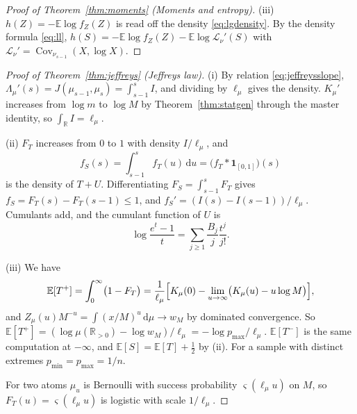 \documentclass[sn-mathphys-num]{sn-jnl}\newcommand{\SNJNL}{}
\theoremstyle{thmstyleone}
\theoremstyle{thmstyletwo}
\theoremstyle{thmstylethree}
\theoremstyle{thmstyleone}
\providecommand{\R}{\mathbb{R}}
\providecommand{\E}{\mathbb{E}}
\providecommand{\Cov}{\operatorname{Cov}}
\providecommand{\Rpos}{\mathbb{R}_{>0}}
\providecommand{\Leh}{\mathscr{L}}
\providecommand{\dd}{\,\mathrm{d}}
\begin{document}
\begin{appendices}
\begin{proof}[Proof of Theorem~\ref{thm:moments} (Moments and entropy)]
			\noindent(iii) $h(Z)=-\E\log f_Z(Z)$ is
			read off the density \eqref{eq:lgdensity}. By the density
			formula \eqref{eq:ll},
			$h(S)=-\E\log f_Z(Z)-\E\log\Leh_\nu'(S)$ with
			$\Leh_\nu'=\Cov_{\nu_{s-1}}(X,\log X)$.
		\end{proof}
		
		\begin{proof}[Proof of Theorem~\ref{thm:jeffreys} (Jeffreys law)]\leavevmode
			
			\noindent(i) By relation \eqref{eq:jeffreysslope},
			$\Lambda_\mu'(s)=J(\mu_{s-1},\mu_s)=\int_{s-1}^{s}I$, and dividing
			by $\ell_\mu$ gives the density. $K_\mu'$ increases from $\log m$
			to $\log M$ by Theorem~\ref{thm:statgen} through the master
			identity, so $\int_\R I=\ell_\mu$.
			
			\noindent(ii) $F_T$ increases from $0$ to
			$1$ with density $I/\ell_\mu$, and
			\begin{equation}\label{eq:convolution}
				f_S(s)=\int_{s-1}^{s}f_T(u)\dd u=\bigl(f_T*\mathbf 1_{[0,1]}\bigr)(s)
			\end{equation}
			is the density of $T+U$. Differentiating $F_S=\int_{s-1}^{s}F_T$
			gives $f_S=F_T(s)-F_T(s-1)\le1$, and $f_S'=(I(s)-I(s-1))/\ell_\mu$.
			Cumulants add, and the cumulant function of $U$ is
			\begin{equation}\label{eq:uniformcumulants}
				\log\frac{e^{t}-1}{t}=\sum_{j\ge1}\frac{B_j}{j}\frac{t^{j}}{j!} .
			\end{equation}
			
			\noindent(iii) We have
			\begin{equation}\label{eq:Tplus}
				\E[T^{+}]=\int_0^\infty\bigl(1-F_T\bigr)
				=\frac1{\ell_\mu}\Bigl[K_\mu(0)-\lim_{u\to\infty}\bigl(K_\mu(u)-u\log M\bigr)\Bigr],
			\end{equation}
			and $Z_\mu(u)M^{-u}=\int(x/M)^{u}\dd\mu\to w_M$ by dominated
			convergence. So $\E[T^{+}]=(\log\mu(\Rpos)-\log w_M)/\ell_\mu=-\log p_{\max}/\ell_\mu$.
			$\E[T^{-}]$ is the same computation at $-\infty$, and
			$\E[S]=\E[T]+\tfrac12$ by (ii). For a sample with distinct extremes
			$p_{\min}=p_{\max}=1/n$.
			
			For two atoms $\mu_u$ is Bernoulli with success probability
			$\varsigma(\ell_\mu u)$ on $M$, so $F_T(u)=\varsigma(\ell_\mu u)$ is
			logistic with scale $1/\ell_\mu$.
			

\end{proof}
\end{appendices}
\end{document}
